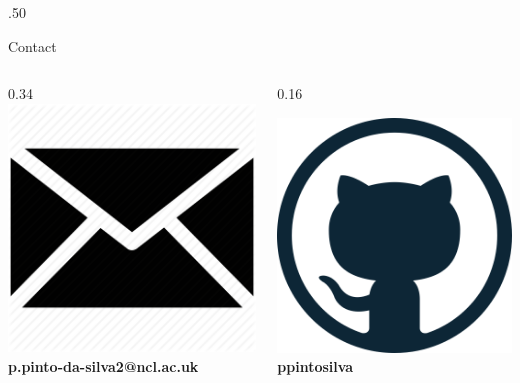 \documentclass[final]{beamer}
\newlength{\colwidth}
\begin{document}
\begin{frame}[t]
\begin{columns}[t]
\begin{column}{\colwidth}
\begin{columns}[t]
\begin{column}{.50\colwidth}
\begin{alertblock}{Contact}
\begin{columns}[t]
\begin{column}{0.34\colwidth}
            \centering\includegraphics[width=0.03\colwidth]{mail.png}\\
            \centering\textbf{p.pinto-da-silva2@ncl.ac.uk}

          \end{column}%

          \begin{column}{0.16\colwidth}

            \centering\includegraphics[width=0.03\colwidth]{github.png}\\
            \textbf{ppintosilva}


\end{column}
\end{columns}
\end{alertblock}
\end{column}
\end{columns}
\end{column}
\end{columns}
\end{frame}
\end{document}
